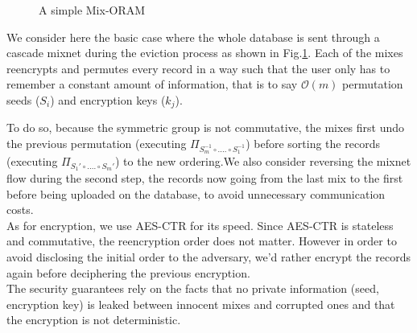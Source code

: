 \documentclass[english,oneside,twocolumn]{article}
\begin{document}
\begin{figure}
\centering
\begin{adjustbox}{width=\textwidth/2}
\end{adjustbox}
\caption{A simple Mix-ORAM} \label{fig:ASMO}
\end{figure} 

We consider here the basic case where the whole database is sent through a cascade mixnet during the eviction process as shown in Fig.\ref{fig:ASMO}.
Each of the mixes reencrypts and permutes every record in a way such that the user only has to remember a constant amount of information, that is to say $\mathcal{O}\left ( m \right )$ permutation seeds ($S_i$) and encryption keys ($k_j$).

To do so, because the symmetric group is not commutative, the mixes first undo the previous permutation (executing $\Pi_{S_m^{-1} \circ .... \circ S_1^{-1}}$) before sorting the records (executing $\Pi_{S_1' \circ .... \circ S_m'}$) to the new ordering.We also consider reversing the mixnet flow during the second step, the records now going from the last mix to the first before being uploaded on the database, to avoid unnecessary communication costs.\\
As for encryption, we use AES-CTR for its speed. Since AES-CTR is stateless and commutative, the reencryption order does not matter. However in order to avoid disclosing the initial order to the adversary, we'd rather encrypt the records again before deciphering the previous encryption.\\
The security guarantees rely on the facts that no private information (seed, encryption key) is leaked between innocent mixes and corrupted ones and that the encryption is not deterministic.
\end{document}
